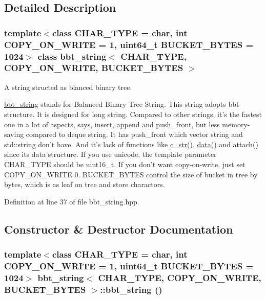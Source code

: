 \subsection{Detailed Description}
\subsubsection*{template$<$class CHAR\_\-TYPE = char, int COPY\_\-ON\_\-WRITE = 1, uint64\_\-t BUCKET\_\-BYTES = 1024$>$ class bbt\_\-string$<$ CHAR\_\-TYPE, COPY\_\-ON\_\-WRITE, BUCKET\_\-BYTES $>$}

A string structed as blanced binary tree. 

\hyperlink{classbbt__string}{bbt\_\-string} stands for Balanced Binary Tree String. This string adopts bbt structure. It is designed for long string. Compared to other strings, it's the fastest one in a lot of aspects, says, insert, append and push\_\-front, but less memory-saving compared to deque string. It has push\_\-front which vector string and std::string don't have. And it's lack of functions like \hyperlink{classbbt__string_c153fa7ac5477ba7ef44c684cb396c0b}{c\_\-str()}, \hyperlink{classbbt__string_bd225f98ab68e2385b6d3e23bd4719cb}{data()} and attach() since its data structure. If you use unicode, the template parameter CHAR\_\-TYPE should be uint16\_\-t. If you don't want copy-on-write, just set COPY\_\-ON\_\-WRITE 0. BUCKET\_\-BYTES control the size of bucket in tree by bytes, which is as leaf on tree and store charactors. 

Definition at line 37 of file bbt\_\-string.hpp.

\subsection{Constructor \& Destructor Documentation}
\hypertarget{classbbt__string_23ed2b13db62f8dbc5f6ce67a070cb90}{
\subsubsection[{bbt\_\-string}]{\setlength{\rightskip}{0pt plus 5cm}template$<$class CHAR\_\-TYPE  = char, int COPY\_\-ON\_\-WRITE = 1, uint64\_\-t BUCKET\_\-BYTES = 1024$>$ {\bf bbt\_\-string}$<$ CHAR\_\-TYPE, COPY\_\-ON\_\-WRITE, BUCKET\_\-BYTES $>$::{\bf bbt\_\-string} ()}}
\label{classbbt__string_23ed2b13db62f8dbc5f6ce67a070cb90}


